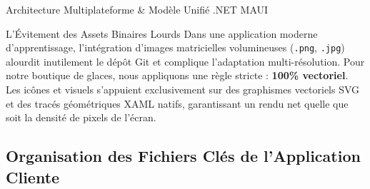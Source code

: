 \begin{schemabox}{Architecture Multiplateforme \& Modèle Unifié .NET MAUI}
\begin{center}
\end{center}
\end{schemabox}

\vspace{0.2cm}

\begin{bestpracticebox}{L'Évitement des Assets Binaires Lourds}
Dans une application moderne d'apprentissage, l'intégration d'images matricielles volumineuses (\texttt{.png}, \texttt{.jpg}) alourdit inutilement le dépôt Git et complique l'adaptation multi-résolution.
Pour notre boutique de glaces, nous appliquons une règle stricte : \textbf{100\% vectoriel}. Les icônes et visuels s'appuient exclusivement sur des graphismes vectoriels SVG et des tracés géométriques XAML natifs, garantissant un rendu net quelle que soit la densité de pixels de l'écran.
\end{bestpracticebox}

\newpage

\subsection*{Organisation des Fichiers Clés de l'Application Cliente}

